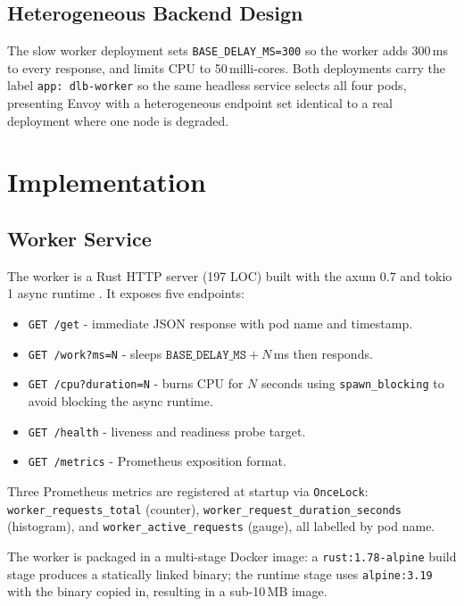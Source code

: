 \documentclass[conference]{IEEEtran}
\begin{document}
\subsection{Heterogeneous Backend Design}

The slow worker deployment sets \texttt{BASE\_DELAY\_MS=300} so the worker
adds 300\,ms to every response, and limits CPU to 50\,milli-cores.
Both deployments carry the label \texttt{app: dlb-worker} so the same headless
service selects all four pods, presenting Envoy with a heterogeneous endpoint
set identical to a real deployment where one node is degraded.

\section{Implementation}
\label{sec:implementation}

\subsection{Worker Service}

The worker is a Rust HTTP server (197 LOC) built with the axum 0.7 and
tokio 1 async runtime \cite{rustlang}.
It exposes five endpoints:

\begin{itemize}
  \item \texttt{GET /get}  -  immediate JSON response with pod name and timestamp.
  \item \texttt{GET /work?ms=N}  -  sleeps $\texttt{BASE\_DELAY\_MS} + N$\,ms then responds.
  \item \texttt{GET /cpu?duration=N}  -  burns CPU for $N$ seconds using
        \texttt{spawn\_blocking} to avoid blocking the async runtime.
  \item \texttt{GET /health}  -  liveness and readiness probe target.
  \item \texttt{GET /metrics}  -  Prometheus exposition format.
\end{itemize}

Three Prometheus metrics are registered at startup via \texttt{OnceLock}:
\texttt{worker\_requests\_total} (counter), \texttt{worker\_request\_duration\_seconds}
(histogram), and \texttt{worker\_active\_requests} (gauge), all labelled
by pod name.

The worker is packaged in a multi-stage Docker image: a \texttt{rust:1.78-alpine}
build stage produces a statically linked binary; the runtime stage uses
\texttt{alpine:3.19} with the binary copied in, resulting in a sub-10\,MB image.
\end{document}
